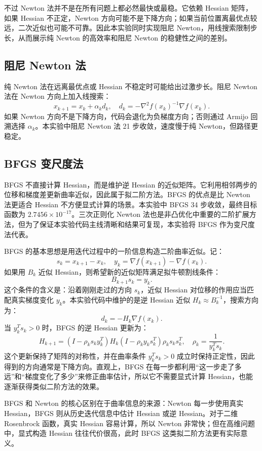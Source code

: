 \documentclass[UTF8,a4paper,12pt,fontset=none]{ctexart}
\begin{document}
不过 Newton 法并不是在所有问题上都必然最快或最稳。它依赖 Hessian 矩阵，如果 Hessian 不正定，Newton 方向可能不是下降方向；如果当前位置离最优点较远，二次近似也可能不可靠。因此本实验同时实现阻尼 Newton，用线搜索限制步长，从而展示纯 Newton 的高效率和阻尼 Newton 的稳健性之间的差别。

\subsection{阻尼 Newton 法}

纯 Newton 法在远离最优点或 Hessian 不稳定时可能给出过激步长。阻尼 Newton 法在 Newton 方向上加入线搜索：
\[
x_{k+1}=x_k+\alpha_k d_k,\quad d_k=-\nabla^2 f(x_k)^{-1}\nabla f(x_k).
\]
如果 Newton 方向不是下降方向，代码会退化为负梯度方向；否则通过 Armijo 回溯选择 $\alpha_k$。本实验中阻尼 Newton 法 21 步收敛，速度慢于纯 Newton，但路径更稳定。

\subsection{BFGS 变尺度法}

BFGS 不直接计算 Hessian，而是维护逆 Hessian 的近似矩阵。它利用相邻两步的位移和梯度差更新曲率近似，因此属于拟二阶方法。BFGS 的优点是比 Newton 法更适合 Hessian 不方便显式计算的场景。本实验中 BFGS 34 步收敛，最终目标函数为 $2.7456\times10^{-17}$。三次正则化 Newton 法也是非凸优化中重要的二阶扩展方法，但为了保证本实验代码主线清晰和结果可复现，本实验将 BFGS 作为变尺度法代表。

BFGS 的基本思想是用迭代过程中的一阶信息构造二阶曲率近似。记：
\[
s_k=x_{k+1}-x_k,\quad y_k=\nabla f(x_{k+1})-\nabla f(x_k).
\]
如果用 $B_k$ 近似 Hessian，则希望新的近似矩阵满足拟牛顿割线条件：
\[
B_{k+1}s_k=y_k.
\]
这个条件的含义是：沿着刚刚走过的方向 $s_k$，近似 Hessian 对位移的作用应当匹配真实梯度变化 $y_k$。本实验代码中维护的是逆 Hessian 近似 $H_k\approx B_k^{-1}$，搜索方向为：
\[
d_k=-H_k\nabla f(x_k).
\]
当 $y_k^Ts_k>0$ 时，BFGS 的逆 Hessian 更新为：
\[
H_{k+1}=
\left(I-\rho_k s_k y_k^T\right)H_k
\left(I-\rho_k y_k s_k^T\right)
\rho_k s_k s_k^T,
\quad
\rho_k=\frac{1}{y_k^Ts_k}.
\]
这个更新保持了矩阵的对称性，并在曲率条件 $y_k^Ts_k>0$ 成立时保持正定性，因此得到的方向通常是下降方向。直观上，BFGS 在每一步都利用“这一步走了多远”和“梯度变化了多少”来修正曲率估计，所以它不需要显式计算 Hessian，也能逐渐获得类似二阶方法的效果。

BFGS 和 Newton 的核心区别在于曲率信息的来源：Newton 每一步使用真实 Hessian，BFGS 则从历史迭代信息中估计 Hessian 或逆 Hessian。对于二维 Rosenbrock 函数，真实 Hessian 容易计算，所以 Newton 非常快；但在高维问题中，显式构造 Hessian 往往代价很高，此时 BFGS 这类拟二阶方法更有实际意义。
\end{document}

